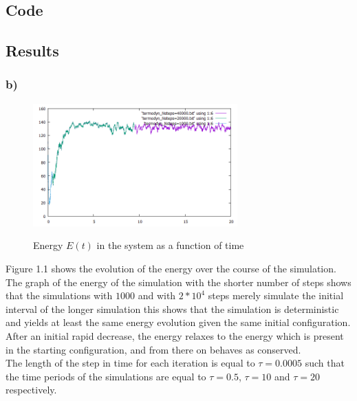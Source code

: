 \documentclass[12pt,a4paper]{article}	%
\begin{document}
\subsection{Code}

%

%

\newpage
\subsection{Results}


\subsubsection*{b)}

\begin{figure}[h!]	
\centering
{\includegraphics[width=0.7\textwidth]{E(t).png}}		
\caption{Energy $E(t)$ in the system as a function of time}
\end{figure}

Figure 1.1 shows the evolution of the energy over the course of the simulation. The graph of the energy of the simulation with the shorter number of steps shows that the simulations with $1000$ and with $2*10^4$ steps merely simulate the initial interval of the longer simulation this shows that the simulation is deterministic and yields at least the same energy evolution given the same initial configuration. \\
After an initial rapid decrease, the energy relaxes to the energy which is present in the starting configuration, and from there on behaves as conserved. \\
The length of the step in time for each iteration is equal to $\tau = 0.0005$ such that the time periods of the simulations are equal to $\tau = 0.5$, $\tau = 10$ and $\tau = 20$ respectively. 
\end{document}
